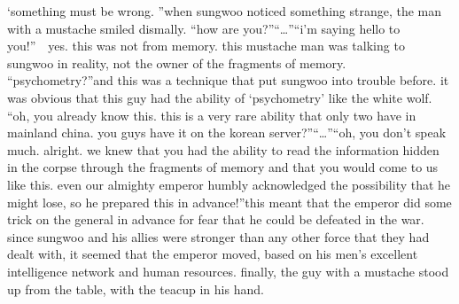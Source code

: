 ‘something must be wrong.
”when sungwoo noticed something strange, the man with a mustache smiled dismally.
“how are you?”“…”“i’m saying hello to you!”  yes.
 this was not from memory.
 this mustache man was talking to sungwoo in reality, not the owner of the fragments of memory.
“psychometry?”and this was a technique that put sungwoo into trouble before.
 it was obvious that this guy had the ability of ‘psychometry’ like the white wolf.
“oh, you already know this.
 this is a very rare ability that only two have in mainland china.
 you guys have it on the korean server?”“…”“oh, you don’t speak much.
 alright.
 we knew that you had the ability to read the information hidden in the corpse through the fragments of memory and that you would come to us like this.
 even our almighty emperor humbly acknowledged the possibility that he might lose, so he prepared this in advance!”this meant that the emperor did some trick on the general in advance for fear that he could be defeated in the war.
since sungwoo and his allies were stronger than any other force that they had dealt with, it seemed that the emperor moved, based on his men’s excellent intelligence network and human resources.
finally, the guy with a mustache stood up from the table, with the teacup in his hand.


 